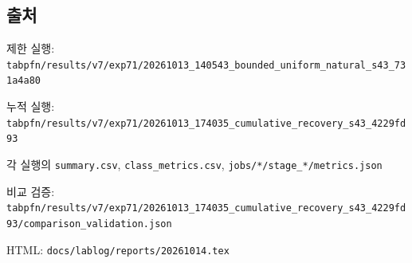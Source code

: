 \subsection{출처}
\par\noindent \textbullet\enspace 제한 실행: \texttt{tabpfn/\allowbreak{}\allowbreak{}r\allowbreak{}esults/\allowbreak{}\allowbreak{}v\allowbreak{}7/\allowbreak{}\allowbreak{}exp71/\allowbreak{}\allowbreak{}20261013\allowbreak{}\_\allowbreak{}\allowbreak{}140543\_\allowbreak{}\allowbreak{}bounded\_\allowbreak{}\allowbreak{}uniform\_\allowbreak{}\allowbreak{}natural\_\allowbreak{}\allowbreak{}s43\_\allowbreak{}\allowbreak{}731a\allowbreak{}4a80}


\par\noindent \textbullet\enspace 누적 실행: \texttt{tabpfn/\allowbreak{}\allowbreak{}r\allowbreak{}esults/\allowbreak{}\allowbreak{}v\allowbreak{}7/\allowbreak{}\allowbreak{}exp71/\allowbreak{}\allowbreak{}20261013\allowbreak{}\_\allowbreak{}\allowbreak{}174035\_\allowbreak{}\allowbreak{}cumulati\allowbreak{}ve\_\allowbreak{}\allowbreak{}recov\allowbreak{}ery\_\allowbreak{}\allowbreak{}s43\_\allowbreak{}\allowbreak{}4229fd93\allowbreak{}}


\par\noindent \textbullet\enspace 각 실행의 \texttt{summary.\allowbreak{}csv}, \texttt{class\_\allowbreak{}\allowbreak{}me\allowbreak{}trics.\allowbreak{}cs\allowbreak{}v}, \texttt{jobs/\allowbreak{}\allowbreak{}*/\allowbreak{}\allowbreak{}s\allowbreak{}tage\_\allowbreak{}\allowbreak{}*/\allowbreak{}\allowbreak{}m\allowbreak{}etrics.\allowbreak{}j\allowbreak{}son}


\par\noindent \textbullet\enspace 비교 검증: \texttt{tabpfn/\allowbreak{}\allowbreak{}r\allowbreak{}esults/\allowbreak{}\allowbreak{}v\allowbreak{}7/\allowbreak{}\allowbreak{}exp71/\allowbreak{}\allowbreak{}20261013\allowbreak{}\_\allowbreak{}\allowbreak{}174035\_\allowbreak{}\allowbreak{}cumulati\allowbreak{}ve\_\allowbreak{}\allowbreak{}recov\allowbreak{}ery\_\allowbreak{}\allowbreak{}s43\_\allowbreak{}\allowbreak{}4229fd93\allowbreak{}/\allowbreak{}\allowbreak{}compari\allowbreak{}son\_\allowbreak{}\allowbreak{}vali\allowbreak{}dation.\allowbreak{}j\allowbreak{}son}


\par\noindent \textbullet\enspace HTML: \texttt{docs/\allowbreak{}\allowbreak{}lab\allowbreak{}log/\allowbreak{}\allowbreak{}repo\allowbreak{}rts/\allowbreak{}\allowbreak{}2026\allowbreak{}1014.\allowbreak{}tex\allowbreak{}}




